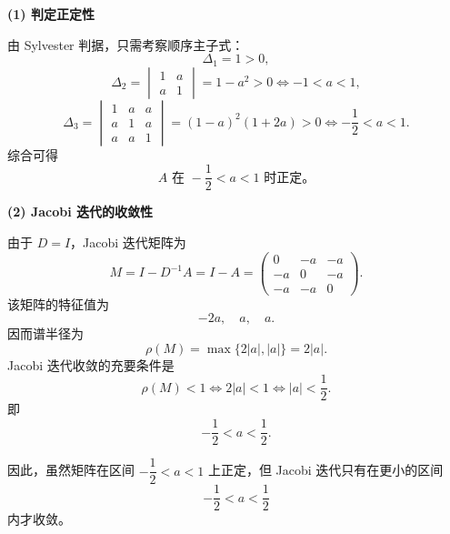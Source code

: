 \documentclass[11pt, a4paper]{ctexart}
\begin{document}
\begin{myproof}
    \textbf{(1) 判定正定性}

    由 Sylvester 判据，只需考察顺序主子式：
    \[
        \Delta_1 = 1 > 0,
    \]
    \[
        \Delta_2 =
        \begin{vmatrix}
            1 & a \\
            a & 1
        \end{vmatrix}
        = 1 - a^2 > 0
        \iff -1 < a < 1,
    \]
    \[
        \Delta_3 =
        \begin{vmatrix}
            1 & a & a \\
            a & 1 & a \\
            a & a & 1
        \end{vmatrix}
        = (1-a)^2(1+2a) > 0
        \iff -\frac{1}{2} < a < 1.
    \]
    综合可得
    \[
        \boxed{A \text{ 在 } -\frac{1}{2} < a < 1 \text{ 时正定。}}
    \]

    \textbf{(2) Jacobi 迭代的收敛性}

    由于 $D = I$，Jacobi 迭代矩阵为
    \[
        M = I - D^{-1}A = I - A
        =
        \begin{pmatrix}
            0 & -a & -a \\
            -a & 0 & -a \\
            -a & -a & 0
        \end{pmatrix}.
    \]
    该矩阵的特征值为
    \[
        -2a,\quad a,\quad a.
    \]
    因而谱半径为
    \[
        \rho(M) = \max\{2|a|, |a|\} = 2|a|.
    \]
    Jacobi 迭代收敛的充要条件是
    \[
        \rho(M) < 1
        \iff
        2|a| < 1
        \iff
        |a| < \frac{1}{2}.
    \]
    即
    \[
        \boxed{-\frac{1}{2} < a < \frac{1}{2}.}
    \]

    因此，虽然矩阵在区间 $-\dfrac{1}{2} < a < 1$ 上正定，但 Jacobi 迭代只有在更小的区间
    \[
        -\frac{1}{2} < a < \frac{1}{2}
    \]
    内才收敛。
\end{myproof}
\end{document}
